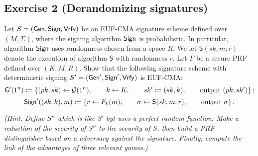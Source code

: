 \subsection{Exercise 2 (Derandomizing signatures)}

Let $S=(\operatorname{\mathsf{Gen}}, \operatorname{\mathsf{Sign}}, \operatorname{\mathsf{Vrfy}})$ be an EUF-CMA signature scheme defined over $(M, \Sigma)$, where the signing algorithm $\operatorname{\mathsf{Sign}}$ is probabilistic.
In particular, algorithm $\operatorname{\mathsf{Sign}}$ uses randomness chosen from a space $R$.
We let $\mathsf{S}(sk, m; r)$ denote the execution of algorithm $\mathsf{S}$ with randomness $r$.
Let $F$ be a secure PRF defined over $(K, M, R)$.
Show that the following signature scheme with deterministic signing $S'=(\operatorname{\mathsf{Gen}}', \operatorname{\mathsf{Sign}}', \operatorname{\mathsf{Vrfy}})$ is EUF-CMA:
\[ \mathsf{G}'(1^n) \coloneqq \left\{ (pk, sk) \leftarrow \mathcal{G}(1^n), \qquad k \leftarrow K, \qquad sk' \coloneqq (sk, k), \qquad \text{output } (pk, sk') \right\}; \]
\[ \operatorname{\mathsf{Sign}}'((sk, k), m) \coloneqq \left\{ r \leftarrow F_k(m), \qquad \sigma \leftarrow \mathsf{S}(sk, m; r), \qquad \text{output } \sigma \right\}. \]

\emph{(Hint: Define $S''$ which is like $S'$ byt uses a perfect random function. Make a reduction of the security of $S''$ to the security of $S$, then build a PRF distinguisher based on a adversary against the signature. Finally, compute the link of the advantages of three relevant games.)}


